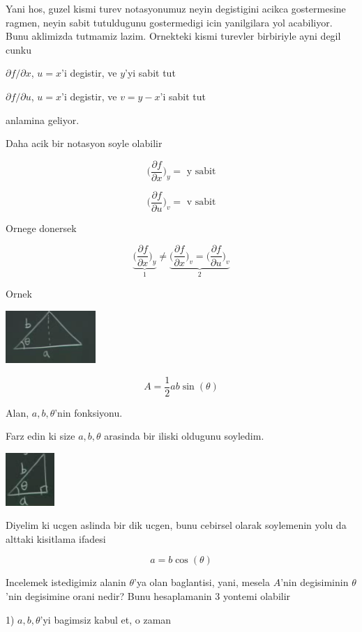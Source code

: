 \documentclass[12pt,fleqn]{article}\usepackage{../common}
\begin{document}
Yani hos, guzel kismi turev notasyonumuz neyin degistigini acikca
gostermesine ragmen, neyin sabit tutuldugunu gostermedigi icin yanilgilara
yol acabiliyor. Bunu aklimizda tutmamiz lazim. Ornekteki kismi turevler
birbiriyle ayni degil cunku 

$\partial f/\partial x$, $u=x$'i degistir, ve $y$'yi sabit tut

$\partial f/\partial u$, $u=x$'i degistir, ve $v = y-x$'i sabit tut

anlamina geliyor. 

Daha acik bir notasyon soyle olabilir

\[ 
\bigg( \frac{\partial f}{\partial x}  \bigg)_y = \textrm { y sabit}
 \]

\[ 
\bigg( \frac{\partial f}{\partial u}  \bigg)_v = \textrm { v sabit}
 \]

Ornege donersek

\[ 
\underbrace{
\bigg( \frac{\partial f}{\partial x}  \bigg)_y 
}_{1} 
\ne 
\underbrace{
\bigg( \frac{\partial f}{\partial x}  \bigg)_v = 
\bigg( \frac{\partial f}{\partial u}  \bigg)_v 
}_{2}
 \]

Ornek

\includegraphics[height=2cm]{14_1.png}

\[ A = \frac{1}{2}ab \sin(\theta) \]

Alan, $a,b,\theta$'nin fonksiyonu. 

Farz edin ki size $a,b,\theta$ arasinda bir iliski oldugunu soyledim. 

\includegraphics[height=2cm]{14_2.png}

Diyelim ki ucgen aslinda bir dik ucgen, bunu cebirsel olarak soylemenin
yolu da alttaki kisitlama ifadesi

\[ a = b \cos(\theta) \]

Incelemek istedigimiz alanin $\theta$'ya olan baglantisi, yani, mesela
$A$'nin degisiminin $\theta$'nin degisimine orani nedir? Bunu hesaplamanin
3 yontemi olabilir

1) $a,b,\theta$'yi bagimsiz kabul et, o zaman
\end{document}
